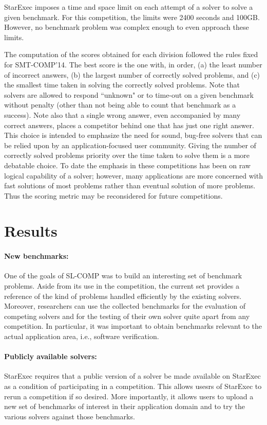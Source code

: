 \documentclass[twoside,11pt]{article}
\begin{document}
StarExec imposes a time and space limit on each attempt of a solver to solve a given benchmark. For this competition, the limits were 2400 seconds and 100GB. However, no benchmark problem was complex enough to even approach these limits.

The computation of the scores obtained for each division followed the rules fixed for SMT-COMP'14.
The best score is the one with, in order, (a) the least number of incorrect answers, (b) the largest number of correctly solved problems, and (c) the smallest time taken in solving the correctly solved problems.
Note that solvers are allowed to respond ``unknown" or to time-out on a given benchmark without penalty (other than not being able to count that benchmark as a success).
Note also that a single wrong answer, even accompanied by many correct answers, places a competitor behind one that has just one right answer. This choice is intended to emphasize the need for sound, bug-free solvers that can be relied upon by an application-focused user community. Giving the number of correctly
solved problems priority over the time taken to solve them is a more debatable choice. To date the emphasis in these competitions has been on raw logical capability of a solver; however, many applications are more concerned with fast solutions of most problems rather than eventual solution of more problems. Thus the scoring metric may be reconsidered for future competitions.




\section{Results}

\paragraph{New benchmarks:}
One of the goals of SL-COMP was to build an interesting set of benchmark problems. 
Aside from its use in the competition, the current set provides a reference of the kind of problems handled efficiently by the existing solvers.
Moreover, researchers can use the collected benchmarks for the evaluation of competing solvers and for the testing of their own solver quite apart from any competition. 
In particular, it was important to obtain benchmarks relevant to the actual application area, i.e., software verification.

\paragraph{Publicly available solvers:} StarExec requires that a public version of a solver be made available on StarExec as a condition of participating in a competition. This allows usesrs of StarExec to rerun a competition if so desired. More importantly, it allows users to upload a new set of benchmarks of interest in their application domain and to try the various solvers against those benchmarks.
\end{document}
